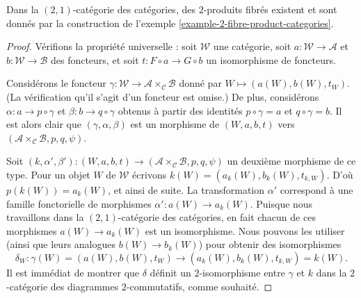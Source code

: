 \begin{lemma}
\label{lemma-2-fibre-product-categories}
Dans la $(2, 1)$-catégorie des catégories, des $2$-produits fibrés existent
et sont donnés par la construction de l'exemple
\ref{example-2-fibre-product-categories}.
\end{lemma}

\begin{proof}
Vérifions la propriété universelle : soit $\mathcal{W}$ une catégorie, soit $a : \mathcal{W} \to \mathcal{A}$ et $b : \mathcal{W} \to \mathcal{B}$ des
foncteurs, et soit $t : F \circ a \to G \circ b$ un isomorphisme de foncteurs.

\medskip\noindent
Considérons le foncteur $\gamma : \mathcal{W} \to \mathcal{A} \times_\mathcal{C}\mathcal{B}$ donné par $W \mapsto (a(W), b(W), t_W)$.
(La vérification qu'il s'agit d'un foncteur est omise.) De plus, considérons $\alpha : a \to p \circ \gamma$ et $\beta : b \to q \circ \gamma$ obtenus à partir des
identités $p \circ \gamma = a$ et $q \circ \gamma = b$. Il est alors clair que
$(\gamma, \alpha, \beta)$ est un morphisme de $(W, a, b, t)$ vers $(\mathcal{A} \times_\mathcal{C} \mathcal{B}, p, q, \psi)$.

\medskip\noindent
Soit $(k, \alpha', \beta') :
(W, a, b, t) \to (\mathcal{A} \times_\mathcal{C} \mathcal{B}, p, q, \psi)$ un deuxième morphisme de ce type. Pour un objet $W$
de $\mathcal{W}$ écrivons $k(W) = (a_k(W), b_k(W), t_{k, W})$. D'où $p(k(W)) = a_k(W)$, et ainsi de suite. La transformation $\alpha'$ correspond à une
famille fonctorielle de morphismes $\alpha' : a(W) \to a_k(W)$. Puisque nous
travaillons dans la $(2, 1)$-catégorie des catégories, en fait chacun de ces
morphismes $a(W) \to a_k(W)$ est un isomorphisme. Nous pouvons les utiliser
(ainsi que leurs analogues $b(W) \to b_k(W)$) pour obtenir des isomorphismes
$$
\delta_W :
\gamma(W) = (a(W), b(W), t_W)
\longrightarrow
(a_k(W), b_k(W), t_{k, W}) = k(W).
$$
Il est immédiat de montrer que $\delta$ définit un $2$-isomorphisme entre
$\gamma$ et $k$ dans la $2$-catégorie des diagrammes $2$-commutatifs, comme
souhaité.
\end{proof}

